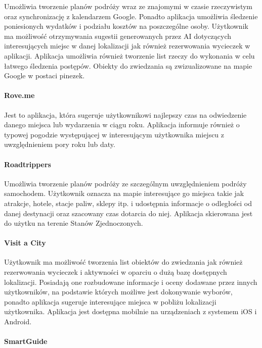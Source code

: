 Umożliwia tworzenie planów podróży wraz ze znajomymi w czasie rzeczywistym oraz synchronizację z kalendarzem Google.
Ponadto aplikacja umożliwia śledzenie poniesionych wydatków i podziału kosztów na poszczególne osoby.
Użytkownik ma możliwość otrzymywania sugestii generowanych przez AI dotyczących interesujących miejsc w danej lokalizacji
jak również rezerwowania wycieczek w aplikacji. Aplikacja umożliwia również tworzenie list rzeczy do wykonania w
celu łatwego śledzenia postępów. Obiekty do zwiedzania są zwizualizowane na mapie Google w postaci pinezek.

\paragraph{Rove.me}

Jest to aplikacja, która sugeruje użytkownikowi najlepszy czas na odwiedzenie danego miejsca lub wydarzenia w ciągu roku.
Aplikacja informuje również o typowej pogodzie występującej w interesującym użytkownika miejscu z uwzględnieniem pory roku lub daty.

\paragraph{Roadtrippers}

Umożliwia tworzenie planów podróży ze szczególnym uwzględnieniem podróży samochodem.
Użytkownik oznacza na mapie interesujące go miejsca takie jak atrakcje, hotele, stacje paliw, sklepy itp.
i udostępnia informacje o odległości od danej destynacji oraz szacowany czas dotarcia do niej.
Aplikacja skierowana jest do użytku na terenie Stanów Zjednoczonych.

\paragraph{Visit a City}

Użytkownik ma możliwość tworzenia list obiektów do zwiedzania jak również rezerwowania wycieczek i aktywności w oparciu o dużą bazę dostępnych lokalizacji.
Posiadają one rozbudowane informacje i oceny dodawane przez innych użytkowników, na podstawie których możliwe jest dokonywanie wyborów, ponadto aplikacja
sugeruje interesujące miejsca w pobliżu lokalizacji użytkownika. Aplikacja jest dostępna mobilnie na urządzeniach z systemem iOS i Android.

\paragraph{SmartGuide}

